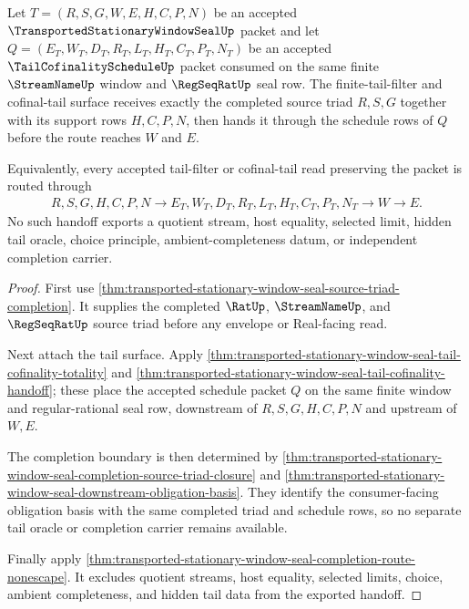 \begin{theorem}
\label{thm:transported-stationary-window-seal-tail-filter-source-triad-handoff}
Let $T=(R,S,G,W,E,H,C,P,N)$ be an accepted $\TransportedStationaryWindowSealUp$ packet and let $Q=(E_T,W_T,D_T,R_T,L_T,H_T,C_T,P_T,N_T)$ be an accepted $\TailCofinalityScheduleUp$ packet consumed on the same finite $\StreamNameUp$ window and $\RegSeqRatUp$ seal row. The finite-tail-filter and cofinal-tail surface receives exactly the completed source triad $R,S,G$ together with its support rows $H,C,P,N$, then hands it through the schedule rows of $Q$ before the route reaches $W$ and $E$.

Equivalently, every accepted tail-filter or cofinal-tail read preserving the packet is routed through
$$
\begin{aligned}
  R,S,G,H,C,P,N
  \longrightarrow
  E_T,W_T,D_T,R_T,L_T,H_T,C_T,P_T,N_T
  \longrightarrow
  W
  \longrightarrow
  E .
\end{aligned}
$$
No such handoff exports a quotient stream, host equality, selected limit, hidden tail oracle, choice principle, ambient-completeness datum, or independent completion carrier.
\end{theorem}
\begin{proof}
First use \autoref{thm:transported-stationary-window-seal-source-triad-completion}. It supplies the completed $\RatUp$, $\StreamNameUp$, and $\RegSeqRatUp$ source triad before any envelope or Real-facing read.

Next attach the tail surface. Apply \autoref{thm:transported-stationary-window-seal-tail-cofinality-totality} and \autoref{thm:transported-stationary-window-seal-tail-cofinality-handoff}; these place the accepted schedule packet $Q$ on the same finite window and regular-rational seal row, downstream of $R,S,G,H,C,P,N$ and upstream of $W,E$.

The completion boundary is then determined by \autoref{thm:transported-stationary-window-seal-completion-source-triad-closure} and \autoref{thm:transported-stationary-window-seal-downstream-obligation-basis}. They identify the consumer-facing obligation basis with the same completed triad and schedule rows, so no separate tail oracle or completion carrier remains available.

Finally apply \autoref{thm:transported-stationary-window-seal-completion-route-nonescape}. It excludes quotient streams, host equality, selected limits, choice, ambient completeness, and hidden tail data from the exported handoff.
\end{proof}

